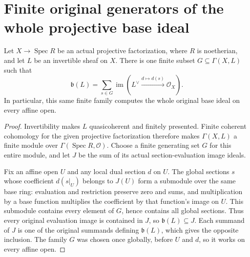 \section{Finite original generators of the whole projective base ideal}

\begin{proposition}
\label{prop:projective-line-base-ideal-finite-global-generators}
Let $X\to\operatorname{Spec}R$ be an actual projective factorization,
where $R$ is noetherian, and let $L$ be an invertible sheaf on $X$.
There is one finite subset $G\subseteq\Gamma(X,L)$ such that
\[
 \mathfrak b(L)=\sum_{s\in G}\operatorname{im}
       (L^\vee\xrightarrow{d\mapsto d(s)}\mathcal O_X).
\]
In particular, this same finite family computes the whole original
base ideal on every affine open.
\leanok
\end{proposition}
\begin{proof}
Invertibility makes $L$ quasicoherent and finitely presented. Finite
coherent cohomology for the given projective factorization therefore
makes $\Gamma(X,L)$ a finite module over $\Gamma(\operatorname{Spec}R,\mathcal O)$.
Choose a finite generating set $G$ for this entire module, and let
$J$ be the sum of its actual section-evaluation image ideals.

Fix an affine open $U$ and any local dual section $d$ on $U$.
The global sections $s$ whose coefficient $d(s|_U)$ belongs to
$J(U)$ form a submodule over the same base ring: evaluation and
restriction preserve zero and sums, and multiplication by a base
function multiplies the coefficient by that function's image on
$U$. This submodule contains every element of $G$, hence contains
all global sections. Thus every original evaluation image is
contained in $J$, so $\mathfrak b(L)\subseteq J$. Each summand of
$J$ is one of the original summands defining $\mathfrak b(L)$,
which gives the opposite inclusion. The family $G$ was chosen once
globally, before $U$ and $d$, so it works on every affine open.
\end{proof}
